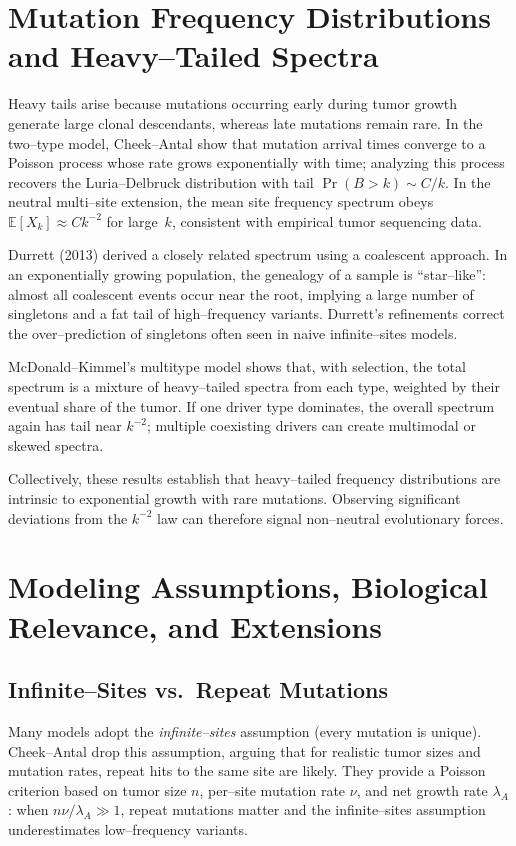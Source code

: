 \documentclass[11pt]{article}
\begin{document}
\section{Mutation Frequency Distributions and Heavy--Tailed Spectra}
Heavy tails arise because mutations occurring early during tumor growth generate large clonal descendants, whereas late mutations remain rare. In the two--type model, Cheek--Antal show that mutation arrival times converge to a Poisson process whose rate grows exponentially with time; analyzing this process recovers the Luria--Delbruck distribution with tail $\Pr(B>k)\sim C/k$. In the neutral multi--site extension, the mean site frequency spectrum obeys $\mathbb{E}[X_k]\approx Ck^{-2}$ for large~$k$, consistent with empirical tumor sequencing data.

Durrett (2013) derived a closely related spectrum using a coalescent approach. In an exponentially growing population, the genealogy of a sample is ``star--like'': almost all coalescent events occur near the root, implying a large number of singletons and a fat tail of high--frequency variants. Durrett’s refinements correct the over--prediction of singletons often seen in naive infinite--sites models.

McDonald--Kimmel’s multitype model shows that, with selection, the total spectrum is a mixture of heavy--tailed spectra from each type, weighted by their eventual share of the tumor. If one driver type dominates, the overall spectrum again has tail near $k^{-2}$; multiple coexisting drivers can create multimodal or skewed spectra.

Collectively, these results establish that heavy--tailed frequency distributions are intrinsic to exponential growth with rare mutations. Observing significant deviations from the $k^{-2}$ law can therefore signal non--neutral evolutionary forces.

\section{Modeling Assumptions, Biological Relevance, and Extensions}
\subsection{Infinite--Sites vs.~Repeat Mutations}
Many models adopt the \emph{infinite--sites} assumption (every mutation is unique). Cheek--Antal drop this assumption, arguing that for realistic tumor sizes and mutation rates, repeat hits to the same site are likely. They provide a Poisson criterion based on tumor size $n$, per--site mutation rate $\nu$, and net growth rate $\lambda_A$: when $n\nu/\lambda_A\gg1$, repeat mutations matter and the infinite--sites assumption underestimates low--frequency variants.
\end{document}
